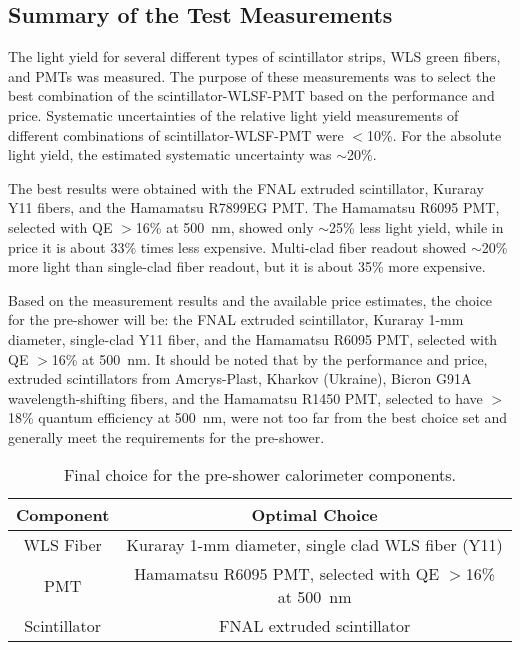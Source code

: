\subsection{Summary of the Test Measurements}

The light yield for several different types of scintillator strips, WLS
green fibers, and PMTs was measured.  The purpose of these measurements
was to select the best combination of the scintillator-WLSF-PMT based on
the performance and price.  Systematic uncertainties of the relative
light yield measurements of different combinations of
scintillator-WLSF-PMT were $<$10\%. For the absolute light yield, the 
estimated systematic uncertainty was $\sim$20\%.

The best results were obtained with the FNAL extruded scintillator, Kuraray 
Y11 fibers, and the Hamamatsu R7899EG PMT. The Hamamatsu R6095 PMT, selected 
with QE $>$16\% at 500~nm, showed only $\sim$25\% less light yield, while in 
price it is about 33\% times less expensive.  Multi-clad fiber readout showed 
$\sim$20\% more light than single-clad fiber readout, but it is about 35\% 
more expensive. 

Based on the measurement results and the available price estimates, the 
choice for the pre-shower will be: the FNAL extruded scintillator, Kuraray
1-mm diameter, single-clad Y11 fiber, and the Hamamatsu R6095 PMT,
selected with QE $>$16\% at 500~nm.  It should be noted that by the
performance and price, extruded scintillators from Amcrys-Plast, Kharkov 
(Ukraine), Bicron G91A wavelength-shifting fibers, and the Hamamatsu 
R1450 PMT, selected to have $>$18\% quantum efficiency at 500~nm, were not
too far from the best choice set and generally meet the requirements
for the pre-shower.     

\begin{table}[htbp]
\begin{center}
\begin{tabular}{||c||c||} \hline 
 Component    & Optimal Choice \\ \hline 
 WLS Fiber    & Kuraray 1-mm diameter, single clad WLS fiber (Y11) \\ \hline 
 PMT          & Hamamatsu R6095 PMT, selected with QE $>$16\% at 500~nm \\ \hline  
 Scintillator & FNAL extruded scintillator \\ \hline  
\end{tabular} 
\end{center} 
\caption{\small{Final choice for the pre-shower calorimeter components.}}
\label{tab:choice} 
\end{table} 

